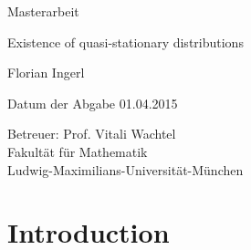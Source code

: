 \documentclass[12pt,a4paper]{scrartcl}
\numberwithin{equation}{section}
\begin{document}
  \pagestyle{empty}

  \begin{titlepage}

    \vspace*{2cm} 

 \begin{center} \large 
    
    Masterarbeit
    \vspace*{2cm}

    {\huge Existence of quasi-stationary distributions}
    \vspace*{2.5cm}

    Florian Ingerl
    \vspace*{1.5cm}

    Datum der Abgabe
		01.04.2015
    \vspace*{4.5cm}


    Betreuer: Prof. Vitali Wachtel \\[1cm]
    Fakultät für Mathematik \\[1cm]
		Ludwig-Maximilians-Universität-München
  \end{center}
\end{titlepage}


\nocite{*}
  \tableofcontents

\newpage
 


  \pagestyle{headings}


\section{Introduction}
\end{document}
